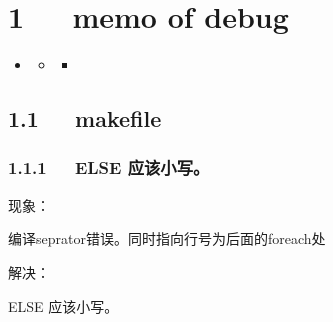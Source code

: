 \documentclass[letterpaper,12pt,english]{sphinxmanual}
\begin{document}
\chapter{1   memo of debug}
\label{\detokenize{000misc/memo-debug:memo-of-debug}}\label{\detokenize{000misc/memo-debug::doc}}
\begin{sphinxShadowBox}
\begin{itemize}
\item {} 
\label{\detokenize{000misc/memo-debug:id2}}{\hyperref[\detokenize{000misc/memo-debug:memo-of-debug}]{}}
\begin{itemize}
\item {} 
\label{\detokenize{000misc/memo-debug:id3}}{\hyperref[\detokenize{000misc/memo-debug:makefile}]{}}
\begin{itemize}
\item {} 
\label{\detokenize{000misc/memo-debug:id4}}{\hyperref[\detokenize{000misc/memo-debug:else}]{}}

\end{itemize}

\end{itemize}

\end{itemize}
\end{sphinxShadowBox}


\section{1.1   makefile}
\label{\detokenize{000misc/memo-debug:makefile}}

\subsection{1.1.1   ELSE 应该小写。}
\label{\detokenize{000misc/memo-debug:else}}
现象：

编译seprator错误。同时指向行号为后面的foreach处

解决：

ELSE 应该小写。
\end{document}
